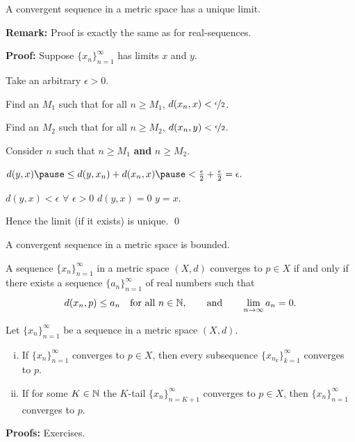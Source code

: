 \documentclass[10pt,aspectratio=169]{beamer}
\begin{document}
\begin{frame}

\begin{proposition}
A convergent sequence in a metric space has a unique limit.
\end{proposition}

\pause
\textbf{Remark:} Proof is exactly the same as for real-sequences.

\pause
\medskip

\textbf{Proof:}
Suppose $\{ x_n \}_{n=1}^\infty$ has limits $x$ and $y$.

\pause
Take an arbitrary $\epsilon > 0$.

\pause
Find an $M_1$ such that for all $n \geq M_1$,
\quad
$d(x_n,x) < \nicefrac{\epsilon}{2}$.


\pause
Find an $M_2$ such that for all $n \geq M_2$,
\quad
$d(x_n,y) < \nicefrac{\epsilon}{2}$.

\pause
Consider $n$ such that $n \geq M_1$ \textbf{and} $n \geq M_2$.

\pause
$
d(y,x)
\pause
\leq
d(y,x_n)+d(x_n,x)
\pause
<
\frac{\epsilon}{2} + \frac{\epsilon}{2} = \epsilon .
$

\pause
$d(y,x) < \epsilon$ $\forall$  $\epsilon > 0$ \wthus $d(y,x) = 0$
\pause
\wthus $y=x$.

\pause
Hence the limit (if it exists) is unique.
\qed

\end{frame}

\begin{frame}

\begin{proposition}
A convergent sequence in a metric space is bounded.
\end{proposition}

\pause
\begin{proposition}
A sequence $\{ x_n \}_{n=1}^\infty$ in a metric space $(X,d)$ converges to $p \in X$
if and only
if there exists a sequence $\{ a_n \}_{n=1}^\infty$ of real numbers such that
\begin{equation*}
d(x_n,p) \leq a_n \quad \text{for all } n \in {\mathbb{N}},
\qquad
\text{and}
\qquad
\lim_{n\to\infty} a_n = 0.
\end{equation*}
\end{proposition}

\pause
\begin{proposition}
Let $\{ x_n \}_{n=1}^\infty$ be a sequence in a metric space $(X,d)$.
\begin{enumerate}[(i)]
\item
\pause
If $\{ x_n \}_{n=1}^\infty$ converges to $p \in X$, then every
subsequence $\{ x_{n_k} \}_{k=1}^\infty$
converges to $p$.
\item
\pause
If for some $K \in {\mathbb{N}}$ the $K$-tail $\{ x_n \}_{n=K+1}^\infty$
converges to $p \in X$, then
 $\{ x_n \}_{n=1}^\infty$ converges to $p$.
\end{enumerate}
\end{proposition}

\pause
\textbf{Proofs:} Exercises.

\end{frame}
\end{document}
